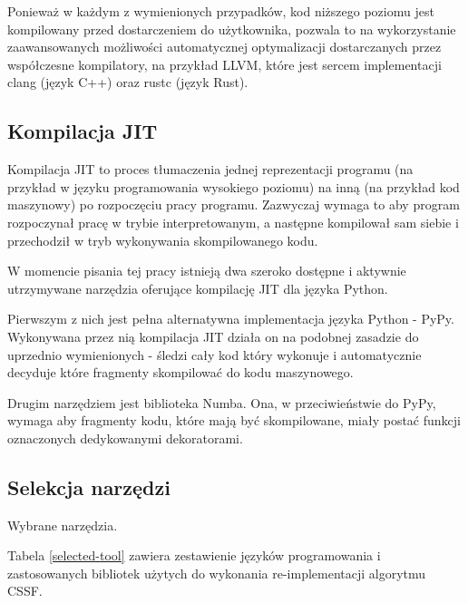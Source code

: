 \documentclass[11pt, a4paper]{article}
\begin{document}
\begin{sloppypar}
    Ponieważ w każdym z wymienionych przypadków, kod niższego poziomu jest kompilowany przed
    dostarczeniem do użytkownika, pozwala to na wykorzystanie zaawansowanych możliwości
    automatycznej optymalizacji dostarczanych przez współczesne kompilatory, na przykład
    LLVM, które jest sercem implementacji clang\cite{ClangHomePage} (język C++) oraz rustc
    (język Rust).

    \subsection{Kompilacja JIT}
    Kompilacja JIT to proces tłumaczenia jednej reprezentacji programu (na przykład w
    języku programowania wysokiego poziomu) na inną (na przykład kod maszynowy) po rozpoczęciu
    pracy programu. Zazwyczaj wymaga to aby program rozpoczynał pracę w trybie
    interpretowanym, a następne kompilował sam siebie i przechodził w tryb wykonywania skompilowanego
    kodu.

    W momencie pisania tej pracy istnieją dwa szeroko dostępne i aktywnie utrzymywane narzędzia
    oferujące kompilację JIT dla języka Python.

    Pierwszym z nich jest pełna alternatywna implementacja języka Python - PyPy\cite{PyPy_Home_Page}.
    Wykonywana przez nią kompilacja JIT działa on na podobnej zasadzie do uprzednio wymienionych
    - śledzi cały kod który wykonuje i automatycznie decyduje które fragmenty skompilować
    do kodu maszynowego\cite{PyPy_JIT}.

    Drugim narzędziem jest biblioteka Numba\cite{Numba_Article}\cite{Numba_Doc}. Ona, w przeciwieństwie
    do PyPy, wymaga aby fragmenty kodu, które mają być skompilowane, miały postać
    funkcji oznaczonych dedykowanymi dekoratorami.

    \subsection{Selekcja narzędzi}
    \FloatBarrier
    \begin{table}[ht]
      \centering
      
      \caption{Wybrane narzędzia.}
      \label{selected-tool}
    \end{table}
    \FloatBarrier

    Tabela \ref{selected-tool} zawiera zestawienie języków programowania i zastosowanych
    bibliotek użytych do wykonania re-implementacji algorytmu CSSF.


\end{sloppypar}
\end{document}
